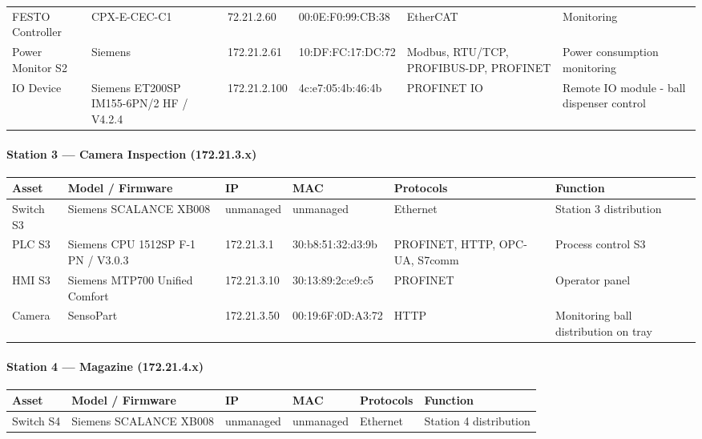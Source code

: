 \documentclass{report}
\begin{document}
{\begin{longtable}{L{2cm} L{2.1cm} L{2.1cm} L{2.6cm} L{2.4cm} L{4cm}}
    FESTO Controller &  CPX-E-CEC-C1 & 72.21.2.60 &  00:0E:F0:99:CB:38 & EtherCAT & Monitoring\\

    Power Monitor S2 & Siemens & 172.21.2.61 & 10:DF:FC:17:DC:72 & Modbus, RTU/TCP, PROFIBUS-DP, PROFINET & Power consumption monitoring \\

    IO Device & Siemens ET200SP IM155-6PN/2 HF / V4.2.4 & 172.21.2.100 &
    4c:e7:05:4b:46:4b & PROFINET IO & Remote IO module - ball dispenser control \\
\bottomrule
\end{longtable}

\paragraph{Station 3 --- Camera Inspection (172.21.3.x)}
\begin{longtable}{L{2cm} L{2.1cm} L{2.1cm} L{2.6cm} L{2.4cm} L{4cm}}
\toprule
\textbf{Asset} & \textbf{Model / Firmware} & \textbf{IP} & \textbf{MAC} & \textbf{Protocols} & \textbf{Function} \\
\midrule \endhead
    Switch S3 & Siemens SCALANCE XB008 & unmanaged & unmanaged & Ethernet &
    Station 3 distribution \\

    PLC S3 & Siemens CPU 1512SP F-1 PN / V3.0.3 & 172.21.3.1 & 30:b8:51:32:d3:9b &
    PROFINET, HTTP, OPC-UA, S7comm & Process control S3 \\

    HMI S3 & Siemens MTP700 Unified Comfort & 172.21.3.10 & 30:13:89:2c:e9:c5 &
    PROFINET & Operator panel \\

    Camera & SensoPart & 172.21.3.50 & 00:19:6F:0D:A3:72 & HTTP & Monitoring ball distribution on tray \\

\bottomrule
\end{longtable}

\paragraph{Station 4 --- Magazine (172.21.4.x)}
\begin{longtable}{L{2cm} L{2.1cm} L{2.1cm} L{2.6cm} L{2.4cm} L{4cm}}
\toprule
\textbf{Asset} & \textbf{Model / Firmware} & \textbf{IP} & \textbf{MAC} & \textbf{Protocols} & \textbf{Function} \\
\midrule \endhead
    Switch S4 & Siemens SCALANCE XB008 & unmanaged & unmanaged & Ethernet &
    Station 4 distribution \\


\end{longtable}}
\end{document}
